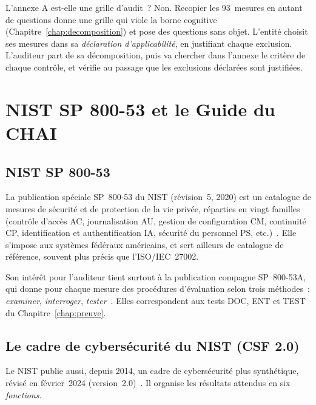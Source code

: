 \begin{boiteRemarque}{L'annexe A est-elle une grille d'audit~?}
Non. Recopier les 93~mesures en autant de questions donne une grille qui
viole la borne cognitive (Chapitre~\ref{chap:decomposition}) et pose des
questions sans objet. L'entité choisit ses mesures dans sa \emph{déclaration
d'applicabilité}, en justifiant chaque exclusion. L'auditeur part de sa
décomposition, puis va chercher dans l'annexe le critère de chaque contrôle,
et vérifie au passage que les exclusions déclarées sont justifiées.
\end{boiteRemarque}

\section{NIST SP 800-53 et le Guide du CHAI}
\label{sec:c14-autres}

\subsection{NIST SP 800-53}

La publication spéciale SP~800-53 du NIST (révision~5, 2020) est un
catalogue de mesures de sécurité et de protection de la vie privée,
réparties en vingt familles (contrôle d'accès AC, journalisation AU,
gestion de configuration CM, continuité CP, identification et
authentification IA, sécurité du personnel PS, etc.)~\cite{nist2020sp80053}.
Elle s'impose aux systèmes fédéraux américains, et sert ailleurs de
catalogue de référence, souvent plus précis que l'ISO/IEC~27002.

Son intérêt pour l'auditeur tient surtout à la publication compagne
SP~800-53A, qui donne pour chaque mesure des procédures d'évaluation selon
trois méthodes~: \emph{examiner}, \emph{interroger}, \emph{tester}~\cite{nist2022sp80053a}.
Elles correspondent aux tests DOC, ENT et TEST du
Chapitre~\ref{chap:preuve}.

\subsection{Le cadre de cybersécurité du NIST (CSF 2.0)}

Le NIST publie aussi, depuis 2014, un cadre de cybersécurité plus
synthétique, révisé en février~2024 (version~2.0)~\cite{nist2024csf}. Il
organise les résultats attendus en six \emph{fonctions}.

